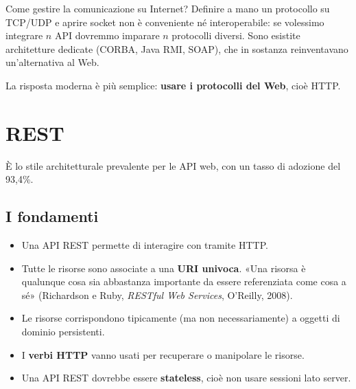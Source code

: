 
Come gestire la comunicazione su Internet? Definire a mano un protocollo su
TCP/UDP e aprire socket non è conveniente né interoperabile: se volessimo
integrare $n$ API dovremmo imparare $n$ protocolli diversi. Sono esistite
architetture dedicate (CORBA, Java RMI, SOAP), che in sostanza reinventavano
un'alternativa al Web.

La risposta moderna è più semplice: \textbf{usare i protocolli del Web}, cioè
HTTP.

\section{REST}


È lo stile architetturale prevalente per le API web, con un tasso di adozione
del 93,4\%.

\subsection{I fondamenti}

\begin{itemize}
  \item Una API REST permette di interagire con  tramite HTTP.
  \item Tutte le risorse sono associate a una \textbf{URI univoca}.
        «Una risorsa è qualunque cosa sia abbastanza importante da essere
        referenziata come cosa a sé» (Richardson e Ruby, \textit{RESTful Web
        Services}, O'Reilly, 2008).
  \item Le risorse corrispondono tipicamente (ma non necessariamente) a oggetti
        di dominio persistenti.
  \item I \textbf{verbi HTTP} vanno usati per recuperare o manipolare le
        risorse.
  \item Una API REST dovrebbe essere \textbf{stateless}, cioè non usare sessioni
        lato server.
\end{itemize}


